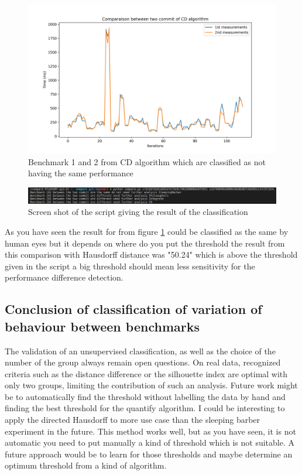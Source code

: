 \documentclass{article}
\begin{document}
\begin{figure}[]
    \centering
    \includegraphics[width=1\textwidth]{images/plot_CD_100.56999999999994.png}
    \caption{Benchmark 1 and 2 from CD algorithm which are classified as not having the same performance}
    \label{fig:bench_1_2_3}
\end{figure}


\begin{figure}[]
    \centering
    \includegraphics[width=1\textwidth]{images/Screenshot_20200829_135418.png}
    \caption{Screen shot of the script giving the result of the classification}
    \label{fig:bench_1_2_4}
\end{figure}

As you have seen the result for from figure \ref{fig:bench_1_2_3} could be classified as the same by human eyes but it depends on where do you put the threshold the result from this comparison with Hausdorff distance was "50.24" which is above the threshold given in the script a big threshold should mean less sensitivity for the performance difference detection.\\

\pagebreak
\newpage


\subsection{Conclusion of classification of variation of behaviour between benchmarks}

The validation of an unsupervised classification, as well as the choice of the number of the group always remain open questions. On real data, recognized criteria such as the distance difference or the silhouette index are optimal with only two groups, limiting the contribution of such an analysis.
Future work might be to automatically find the threshold without labelling the data by hand and finding the best threshold for the quantify algorithm.
I could be interesting to apply the directed Hausdorff to more use case than the sleeping barber experiment in the future.
This method works well, but as you have seen, it is not automatic you need to put manually a kind of threshold which is not suitable.
A future approach would be to learn for those thresholds and maybe determine an optimum threshold from a kind of algorithm.
\end{document}
